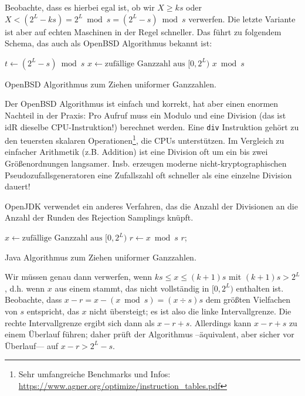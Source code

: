 Beobachte, dass es hierbei egal ist, ob wir $X \ge ks$ oder $X < (2^L - ks) = 2^L \bmod s = (2^L -s) \bmod s$ verwerfen.
Die letzte Variante ist aber auf echten Maschinen in der Regel schneller.
Das führt zu folgendem Schema, das auch als OpenBSD Algorithmus bekannt ist:

\begin{algorithm}[H]
    $t \gets (2^L - s) \bmod s$
    $x \gets \text{zufällige Ganzzahl aus $[0, 2^L)$}$\;
    \While{x < t}{
    $x \gets \text{zufällige Ganzzahl aus $[0, 2^L)$}$\;
    }
    \Return $x \bmod s$\;
    \caption{OpenBSD Algorithmus zum Ziehen uniformer Ganzzahlen.}
\end{algorithm}

Der OpenBSD Algorithmus ist einfach und korrekt, hat aber einen enormen Nachteil in der Praxis:
Pro Aufruf muss ein Modulo und eine Division (das ist idR dieselbe CPU-Instruktion!) berechnet werden.
Eine \texttt{div} Instruktion gehört zu den teuersten skalaren Operationen\footnote{Sehr umfangreiche Benchmarks und Infos: \url{https://www.agner.org/optimize/instruction_tables.pdf}}, die CPUs unterstützen.
Im Vergleich zu einfacher Arithmetik (z.B. Addition) ist eine Division oft um ein bis zwei Größenordnungen langsamer.
Insb. erzeugen moderne nicht-kryptographischen Pseudozufallsgeneratoren eine Zufallszahl oft schneller als eine einzelne Division dauert!

OpenJDK verwendet ein anderes Verfahren, das die Anzahl der Divisionen an die Anzahl der Runden des Rejection Samplings knüpft.

\begin{algorithm}[H]
    $x \gets \text{zufällige Ganzzahl aus $[0, 2^L)$}$\;
    $r \gets x \bmod s$\;
    \While{$x - r > 2^L - s$}{
    $x \gets \text{zufällige Ganzzahl aus $[0, 2^L)$}$\;
    $r \gets x \bmod s$\;
    }
    \Return $r$;
    \caption{Java Algorithmus zum Ziehen uniformer Ganzzahlen.}
\end{algorithm}

Wir müssen genau dann verwerfen, wenn $ks \le x \le (k+1)s$ mit $(k+1)s > 2^L$, d.h. wenn $x$ aus einem  stammt, das nicht vollständig in $[0, 2^L)$ enthalten ist.
Beobachte, dass $x - r = x - (x \bmod s) = (x \div s)s$ dem größten Vielfachen von $s$ entspricht, das $x$ nicht übersteigt;
es ist also die linke Intervallgrenze.
Die rechte Intervallgrenze ergibt sich dann als $x- r +s$.
Allerdings kann $x - r + s$ zu einem Überlauf führen; daher prüft der Algorithmus --äquivalent, aber sicher vor Überlauf--- auf $x - r > 2^L - s$.

